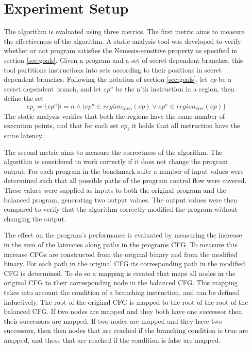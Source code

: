 \section{Experiment Setup}
\label{sec:setup}
The algorithm is evaluated using three metrics. The first metric aims to measure the effectiveness of the algorithm. A static analysis tool was developed to verify 
whether or not program satisfies the Nemesis-sensitive property as specified in section \ref{sec:goals}.
Given a program and a set of secret-dependent branches, this tool partitions instructions into sets according to their positions in secret dependent branches. Following the notation of section \ref{sec:goals}, let \textit{ep} be a secret dependent branch, and let $ep^n$ be the n'th instruction in a region, then define the set 
\begin{equation} \label{eq:toolSets}
    ep_i = \{ ep^n |i = n \land  (ep^n \in region_{then}(ep) \lor ep^n \in region_{else}(ep)\}
\end{equation}
The static analysis verifies that both the regions have the same number of execution points, and that for each set $ep_i$ it holds that all 
instruction have the same latency.

The second metric aims to measure the correctness of the algorithm. The algorithm is considered to work correctly if it does not change the program output. For each program in the benchmark suite a number of input values were determined such that all possible paths of the program control flow were covered.
These values were supplied as inputs to both the original program and the balanced program, generating two output values. The output values were then compared to 
verify that the algorithm correctly modified the program without changing the output. 

The effect on the program's performance is evaluated by measuring the increase in the sum of the latencies along paths in the programs CFG. 
To measure this increase CFGs are constructed from the original binary and from the modified binary. 
For each path in the original CFG its corresponding path in the modified CFG is determined. To do so a mapping is created that maps all nodes in the original CFG to their corresponding node in the balanced CFG. 
This mapping takes into account the condition of a branching instruction, and can be defined inductively. 
The root of the original CFG is mapped to the root of the root of the balanced CFG. 
If two nodes are mapped and they both have one successor then their successors are mapped. 
If two nodes are mapped and they have two successors, then then nodes that are reached if the branching condition is true are mapped,
and those that are reached if the condition is false are mapped.

